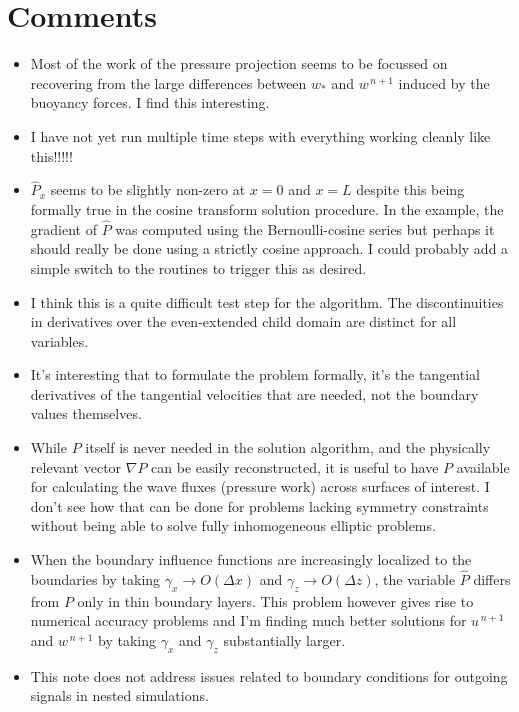 \documentclass{jfm-like}
\begin{document}
\section{Comments}
\begin{itemize}
\setlength\itemsep{1em}
\item Most of the work of the pressure projection seems to be focussed on recovering from the large differences between $w_*$ and $w^{\,n+1}$ induced by the buoyancy forces. I find this interesting.
\item I have not yet run multiple time steps with everything working cleanly like this!!!!!
\item ${\hat P}_x$ seems to be slightly non-zero at $x=0$ and $x=L$ despite this being formally true in the cosine transform solution procedure. In the example, the gradient of ${\hat P}$ was computed
using the Bernoulli-cosine series but perhaps it should really be done using a strictly cosine approach. I could probably add a simple switch to the routines to trigger this as desired.
\item I think this is a quite difficult test step for the algorithm. The discontinuities in derivatives over the even-extended child domain are distinct for all variables.
\item It's interesting that to formulate the problem formally, it's the tangential derivatives of the tangential velocities that are needed, not the boundary values themselves.
\item While $P$ itself is never needed in the solution algorithm, and the physically relevant vector $\nabla P$ can be easily reconstructed, it is useful to have $P$ available for calculating
the wave fluxes (pressure work) across surfaces of interest. I don't see how that can be done for problems lacking symmetry constraints without being able to solve fully inhomogeneous elliptic problems.
\item When the boundary influence functions are increasingly localized to the boundaries by taking $\gamma_x \to O(\Delta x)$ and $\gamma_z \to O(\Delta z)$, the variable ${\hat P}$ differs from $P$
only in thin boundary layers. This problem however gives rise to numerical accuracy problems and I'm finding much better solutions for $u^{\,n+1}$ and $w^{\,n+1}$ by taking $\gamma_x$ and $\gamma_z$
substantially larger.
\item This note does not address issues related to boundary conditions for outgoing signals in nested simulations.
\end{itemize}





\end{document}
